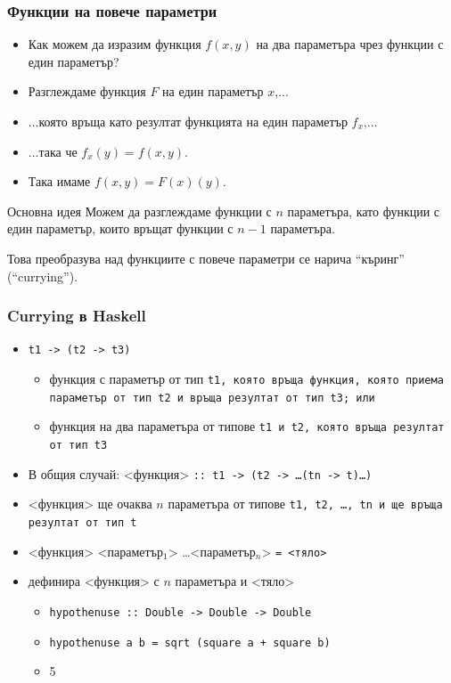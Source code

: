 \documentclass{beamer}
\begin{document}
\begin{frame}
  \frametitle{Функции на повече параметри}
  \begin{itemize}[<+->]
  \item Как можем да изразим функция $f(x,y)$ на два параметъра чрез функции с един параметър?
  \item Разглеждаме функция $F$ на един параметър $x$,...
  \item ...която връща като резултат функцията на един параметър $f_x$,...
  \item ...така че $f_x(y) = f(x,y)$.
  \item Така имаме $f(x,y) = F(x)(y)$.
  \end{itemize}
  \pause
  \begin{block}{Основна идея}
    Можем да разглеждаме функции с $n$ параметъра, като функции с един параметър, които връщат функции с $n-1$ параметъра.
  \end{block}
  \pause
  \alert{Това преобразува над функциите с повече параметри се нарича ``къринг'' (``currying'').}
\end{frame}

\begin{frame}
  \frametitle{Currying в Haskell}
  \begin{itemize}[<+->]
  \item \tt{t1 \alert{->} (t2 \alert{->} t3)}
    \begin{itemize}
    \item функция с параметър от тип \tt{t1}, която връща функция, която приема параметър от тип \tt{t2} и връща резултат от тип \tt{t3}; или
    \item функция на два параметъра от типове \tt{t1} и \tt{t2}, която връща резултат от тип \tt{t3}
    \end{itemize}
  \item В общия случай: <функция> \tt{\alert{::} t1 \alert{->} (t2 \alert{->}} \ldots \tt{(tn \alert{->} t)}\ldots\tt)
  \item{} <функция> ще очаква $n$ параметъра от типове \tt{t1}, \tt{t2}, \ldots, \tt{tn} и ще връща резултат от тип \tt{t}
  \item{} <функция> <параметър$_1$> \ldots <параметър$_n$> \tt= <тяло>
  \item дефинира <функция> с $n$ параметъра и <тяло>
    \begin{itemize}
    \item \tt{hypothenuse :: Double -> Double -> Double}
    \item \tt{hypothenuse a b = sqrt (square a + square b)}
    \item {}5
    \end{itemize}
  \end{itemize}
\end{frame}
\end{document}
